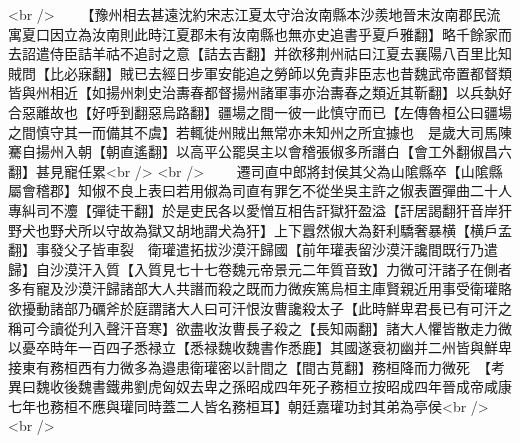 <br />
　　【豫州相去甚遠沈約宋志江夏太守治汝南縣本沙羨地晉末汝南郡民流寓夏口因立為汝南則此時江夏郡未有汝南縣也無亦史追書乎夏戶雅翻】略千餘家而去詔遣侍臣詰羊祜不追討之意【詰去吉翻】并欲移荆州祜曰江夏去襄陽八百里比知賊問【比必寐翻】賊已去經日步軍安能追之勞師以免責非臣志也昔魏武帝置都督類皆與州相近【如揚州刺史治夀春都督揚州諸軍事亦治夀春之類近其靳翻】以兵埶好合惡離故也【好呼到翻惡烏路翻】疆場之間一彼一此慎守而已【左傳魯桓公曰疆場之間慎守其一而備其不虞】若輒徙州賊出無常亦未知州之所宜據也　是歲大司馬陳騫自揚州入朝【朝直遙翻】以高平公罷吳主以會稽張俶多所譖白【會工外翻俶昌六翻】甚見寵任累<br />
<br />
　　遷司直中郎將封侯其父為山隂縣卒【山隂縣屬會稽郡】知俶不良上表曰若用俶為司直有罪乞不從坐吳主許之俶表置彈曲二十人專糾司不灋【彈徒干翻】於是吏民各以愛憎互相告訐獄犴盈溢【訐居謁翻犴音岸犴野犬也野犬所以守故為獄又胡地謂犬為犴】上下囂然俶大為姧利驕奢暴横【横戶孟翻】事發父子皆車裂　衛瓘遣拓拔沙漠汗歸國【前年瓘表留沙漠汗讒間既行乃遣歸】自沙漠汗入質【入質見七十七卷魏元帝景元二年質音致】力微可汗諸子在側者多有寵及沙漠汗歸諸部大人共譖而殺之既而力微疾篤烏桓主庫賢親近用事受衛瓘賂欲擾動諸部乃礪斧於庭謂諸大人曰可汗恨汝曹讒殺太子【此時鮮卑君長已有可汗之稱可今讀從刋入聲汗音寒】欲盡收汝曹長子殺之【長知兩翻】諸大人懼皆散走力微以憂卒時年一百四子悉禄立【悉禄魏收魏書作悉鹿】其國遂衰初幽并二州皆與鮮卑接東有務桓西有力微多為邉患衛瓘密以計間之【間古莧翻】務桓降而力微死　【考異曰魏收後魏書鐵弗劉虎匈奴去卑之孫昭成四年死子務桓立按昭成四年晉成帝咸康七年也務桓不應與瓘同時蓋二人皆名務桓耳】朝廷嘉瓘功封其弟為亭侯<br />
<br />
